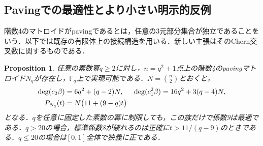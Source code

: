 \documentclass[12pt]{amsart}
\newtheorem{prop}[thm]{Proposition}
\theoremstyle{definition}
\theoremstyle{remark}
\numberwithin{equation}{section}
\begin{document}
\subsection{Pavingでの最適性とより小さい明示的反例}
階数4のマトロイドがpavingであるとは，任意の3元部分集合が独立であることをいう．以下では既存の有限体上の接続構造を用いる．新しい主張はそのChern交叉数に関するものである．

\begin{prop}\label{ja-inversive}
任意の素数冪$q\geq2$に対し，$n=q^2+1$点上の階数4のpavingマトロイド$N_q$が存在し，$\mathbb F_q$上で実現可能である．$N=\binom n2$とおくと，
\begin{align}\label{ja-inversive-chern}
 \deg(c_2\beta)&=6q^2+(q-2)N,&
 \deg(c_1^2\beta)&=16q^2+3(q-4)N,\notag\\
 P_{N_q}(t)&=N\bigl(11+(9-q)t\bigr)
\end{align}
となる．$q$を任意に固定した素数の冪に制限しても，この族だけで係数9は最適である．$q>20$の場合，標準係数8が破れるのは正確に$t>11/(q-9)$のときである．$q\leq20$の場合は$[0,1]$全体で狭義に正である．
\end{prop}
\end{document}
